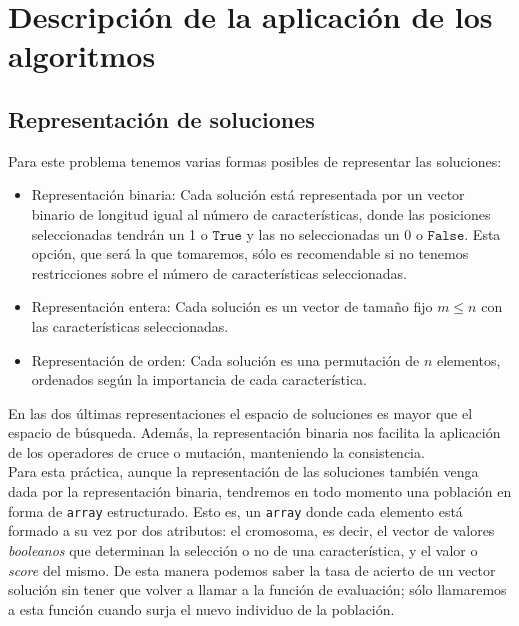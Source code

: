 \documentclass[11pt,leqno]{article}
\begin{document}
\section{Descripción de la aplicación de los algoritmos}

\subsection{Representación de soluciones}
	Para este problema tenemos varias formas posibles de representar las soluciones:
	\begin{itemize}
		\item Representación binaria: Cada solución está representada por un vector binario de longitud igual al número de características, donde las posiciones seleccionadas tendrán un 1 o $\texttt{True}$ y las no seleccionadas un 0 o $\texttt{False}$. Esta opción, que será la que tomaremos, sólo es recomendable si no tenemos restricciones sobre el número de características seleccionadas.
		\item Representación entera: Cada solución es un vector de tamaño fijo $m \leq n$ con las características seleccionadas.
		\item Representación de orden: Cada solución es una permutación de $n$ elementos, ordenados según la importancia de cada característica.
	\end{itemize}
	En las dos últimas representaciones el espacio de soluciones es mayor que el espacio de búsqueda. Además, la representación binaria nos facilita la aplicación de los operadores de cruce o mutación, manteniendo la consistencia.\\
	Para esta práctica, aunque la representación de las soluciones también venga dada por la representación binaria, tendremos en todo momento una población en forma de \texttt{array} estructurado. Esto es, un \texttt{array} donde cada elemento está formado a su vez por dos atributos: el cromosoma, es decir, el vector de valores \textit{booleanos} que determinan la selección o no de una característica, y el valor o \textit{score} del mismo. De esta manera podemos saber la tasa de acierto de un vector solución sin tener que volver a llamar a la función de evaluación; sólo llamaremos a esta función cuando surja el nuevo individuo de la población.
\end{document}
